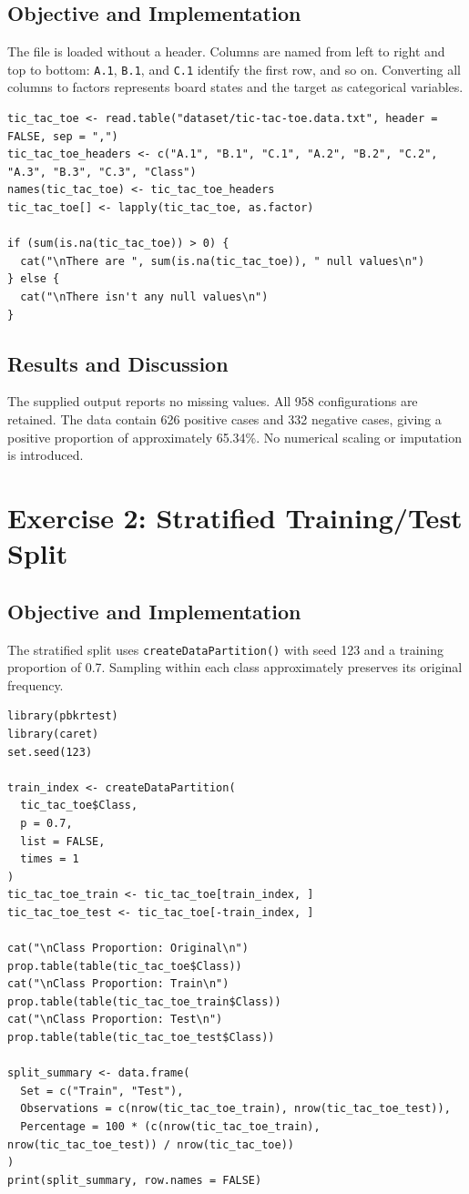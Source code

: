 \documentclass[11pt,a4paper]{article}
\begin{document}
\subsection{Objective and Implementation}
The file is loaded without a header. Columns are named from left to right and top to bottom: \texttt{A.1}, \texttt{B.1}, and \texttt{C.1} identify the first row, and so on. Converting all columns to factors represents board states and the target as categorical variables.
\begin{lstlisting}
tic_tac_toe <- read.table("dataset/tic-tac-toe.data.txt", header = FALSE, sep = ",")
tic_tac_toe_headers <- c("A.1", "B.1", "C.1", "A.2", "B.2", "C.2", "A.3", "B.3", "C.3", "Class")
names(tic_tac_toe) <- tic_tac_toe_headers
tic_tac_toe[] <- lapply(tic_tac_toe, as.factor)

if (sum(is.na(tic_tac_toe)) > 0) {
  cat("\nThere are ", sum(is.na(tic_tac_toe)), " null values\n")
} else {
  cat("\nThere isn't any null values\n")
}
\end{lstlisting}

\subsection{Results and Discussion}

The supplied output reports no missing values. All 958 configurations are retained. The data contain 626 positive cases and 332 negative cases, giving a positive proportion of approximately 65.34\%. No numerical scaling or imputation is introduced.

\section{Exercise 2: Stratified Training/Test Split}
\subsection{Objective and Implementation}
The stratified split uses \texttt{createDataPartition()} with seed 123 and a training proportion of 0.7. Sampling within each class approximately preserves its original frequency.
\begin{lstlisting}
library(pbkrtest)
library(caret)
set.seed(123)

train_index <- createDataPartition(
  tic_tac_toe$Class,
  p = 0.7,
  list = FALSE,
  times = 1
)
tic_tac_toe_train <- tic_tac_toe[train_index, ]
tic_tac_toe_test <- tic_tac_toe[-train_index, ]

cat("\nClass Proportion: Original\n")
prop.table(table(tic_tac_toe$Class))
cat("\nClass Proportion: Train\n")
prop.table(table(tic_tac_toe_train$Class))
cat("\nClass Proportion: Test\n")
prop.table(table(tic_tac_toe_test$Class))

split_summary <- data.frame(
  Set = c("Train", "Test"),
  Observations = c(nrow(tic_tac_toe_train), nrow(tic_tac_toe_test)),
  Percentage = 100 * (c(nrow(tic_tac_toe_train), nrow(tic_tac_toe_test)) / nrow(tic_tac_toe))
)
print(split_summary, row.names = FALSE)
\end{lstlisting}
\end{document}
